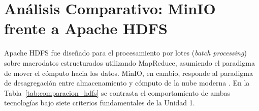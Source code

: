 \documentclass[12pt,a4paper]{article}
\begin{document}
\section{Análisis Comparativo: MinIO frente a Apache HDFS}

Apache HDFS fue diseñado para el procesamiento por lotes (\emph{batch processing}) sobre macrodatos estructurados utilizando MapReduce, asumiendo el paradigma de mover el cómputo hacia los datos. MinIO, en cambio, responde al paradigma de desagregación entre almacenamiento y cómputo de la nube moderna \cite{gadban2021s3hpc,malhotra2025evaluating}. En la Tabla~\ref{tab:comparacion_hdfs} se contrasta el comportamiento de ambas tecnologías bajo siete criterios fundamentales de la Unidad 1.
\end{document}
